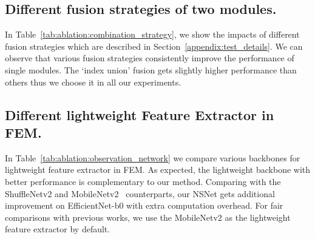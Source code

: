 \documentclass[runningheads]{llncs}
\newcommand{\tabref}[1]{Table~\ref{#1}}
\newcommand{\secref}[1]{Section~\ref{#1}}
\begin{document}
\subsection{Different fusion strategies of two modules.}
In \tabref{tab:ablation:combination_strategy}, we show the impacts of different fusion strategies which are described in \secref{appendix:test_details}. We can observe that various fusion strategies consistently improve the performance of single modules. The `index union' fusion gets slightly higher performance than others thus we choose it in all our experiments.

\begin{table}[h]
\centering
\caption{Comparison of various fusion strategies.}
\label{tab:ablation:combination_strategy}
\setlength{\tabcolsep}{4.5pt}
\renewcommand{\arraystretch}{0.9}
\end{table}
\subsection{Different lightweight Feature Extractor in FEM.}
In \tabref{tab:ablation:observation_network} we compare various backbones for lightweight feature extractor in FEM. 
As expected, the lightweight backbone with better performance is complementary to our method.
Comparing with the ShuffleNetv2 \cite{shufflenetv2} and MobileNetv2~\cite{mobilenetv2} counterparts, our NSNet gets additional improvement on EfficientNet-b0 \cite{efficientnet} with extra computation overhead.
For fair comparisons with previous works, we use the MobileNetv2 as the lightweight feature extractor by default.
\begin{table}[h]
\centering
{}
\caption{Study on different backbones for lightweight extractor in FEM. FLOPs/f means FLOPs for each frame processed by the backbone.}
\label{tab:ablation:observation_network}
\end{table}
\end{document}
